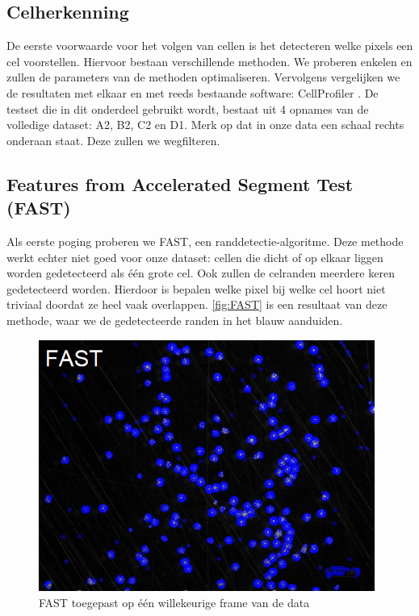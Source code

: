 \documentclass{article}
\begin{document}
\begin{multicols}{2}

\section{Celherkenning}
De eerste voorwaarde voor het volgen van cellen is het detecteren welke pixels een cel voorstellen. Hiervoor bestaan verschillende methoden. We proberen enkelen en zullen de parameters van de methoden optimaliseren. Vervolgens vergelijken we de resultaten met elkaar en met reeds bestaande software: CellProfiler \cite{cell_profiler_org}.
De testset die in dit onderdeel gebruikt wordt, bestaat uit 4 opnames van de volledige dataset: A2, B2, C2 en D1.
Merk op dat in onze data een schaal rechts onderaan staat. Deze zullen we wegfilteren.

\subsection{Features from Accelerated Segment Test (FAST)}
\label{sec:fast}
Als eerste poging proberen we FAST\cite{ref_fast}, een randdetectie-algoritme. Deze methode werkt echter niet goed voor onze dataset: cellen die dicht of op elkaar liggen worden gedetecteerd als één grote cel. Ook zullen de celranden meerdere keren gedetecteerd worden. Hierdoor is bepalen welke pixel bij welke cel hoort niet triviaal doordat ze heel vaak overlappen. \autoref{fig:FAST} is een resultaat van deze methode, waar we de gedetecteerde randen in het blauw aanduiden.

\begin{figure}[H]
\centering
\includegraphics[width=0.98\textwidth]{images/fast_true.png}
\caption{\label{fig:FAST}FAST toegepast op één willekeurige frame van de data}
\end{figure}


\end{multicols}
\end{document}
